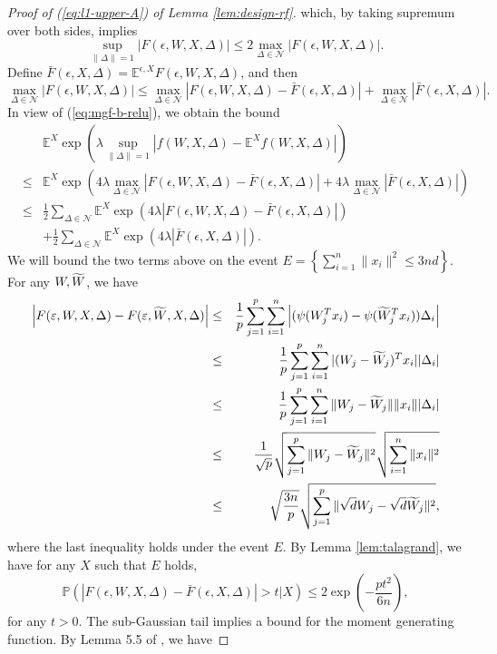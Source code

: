 \begin{proof}[Proof of (\ref{eq:l1-upper-A}) of Lemma \ref{lem:design-rf}]
which, by taking supremum over both sides, implies
$$\sup_{\|\Delta\|=1}|F(\epsilon,W,X,\Delta)|\leq 2\max_{\Delta\in\mathcal{N}}|F(\epsilon,W,X,\Delta)|.$$
Define $\bar{F}(\epsilon,X,\Delta)=\mathbb{E}^{\epsilon,X}F(\epsilon,W,X,\Delta)$, and then
$$\max_{\Delta\in\mathcal{N}}|F(\epsilon,W,X,\Delta)|\leq \max_{\Delta\in\mathcal{N}}|F(\epsilon,W,X,\Delta)-\bar{F}(\epsilon,X,\Delta)|+\max_{\Delta\in\mathcal{N}}|\bar{F}(\epsilon,X,\Delta)|.$$
In view of (\ref{eq:mgf-b-relu}), we obtain the bound
\begin{eqnarray}
\nonumber && \mathbb{E}^X\exp\left(\lambda \sup_{\|\Delta\|=1}\left|f(W,X,\Delta)-\mathbb{E}^Xf(W,X,\Delta)\right|\right) \\
\nonumber &\leq& \mathbb{E}^X\exp\left(4\lambda \max_{\Delta\in\mathcal{N}}|F(\epsilon,W,X,\Delta)-\bar{F}(\epsilon,X,\Delta)|+4\lambda \max_{\Delta\in\mathcal{N}}|\bar{F}(\epsilon,X,\Delta)|\right) \\
\label{eq:tala-mgf1-relu} &\leq& \frac{1}{2}\sum_{\Delta\in\mathcal{N}} \mathbb{E}^{X}\exp\left(4\lambda|F(\epsilon,W,X,\Delta)-\bar{F}(\epsilon,X,\Delta)|\right) \\
\label{eq:tala-mgf2-relu} && + \frac{1}{2}\sum_{\Delta\in\mathcal{N}} \mathbb{E}^{X}\exp\left(4\lambda |\bar{F}(\epsilon,X,\Delta)|\right).
\end{eqnarray}
We will bound the two terms above on the event $E=\left\{\sum_{i=1}^n\|x_i\|^2\leq 3nd\right\}$. For any $W,\widetilde{W}$, we have
\begin{eqnarray*}
\left|F(\epsilon,W,X,\Delta)-F(\epsilon,\wt{W},X,\Delta)\right| &\leq& \frac{1}{p}\sum_{j=1}^p\sum_{i=1}^n\left|({\psi}(W_j^Tx_i)-{\psi}(\wt{W}_j^Tx_i))\Delta_i\right| \\
&\leq& \frac{1}{p}\sum_{j=1}^p\sum_{i=1}^n|(W_j-\wt{W}_j)^Tx_i||\Delta_i| \\
&\leq& \frac{1}{p}\sum_{j=1}^p\sum_{i=1}^n\|W_j-\wt{W}_j\|\|x_i\||\Delta_i| \\
&\leq& \frac{1}{\sqrt{p}}\sqrt{\sum_{j=1}^p\|W_j-\wt{W}_j\|^2}\sqrt{\sum_{i=1}^n\|x_i\|^2} \\
&\leq& \sqrt{\frac{3n}{p}}\sqrt{\sum_{j=1}^p\|\sqrt{d}W_j-\sqrt{d}\wt{W}_j\|^2},
\end{eqnarray*}
where the last inequality holds under the event $E$. By Lemma \ref{lem:talagrand}, we have for any $X$ such that $E$ holds,
$$\mathbb{P}\left(|F(\epsilon,W,X,\Delta)-\bar{F}(\epsilon,X,\Delta)|>t\big|X\right)\leq 2\exp\left(-\frac{pt^2}{6n}\right),$$
for any $t>0$. The sub-Gaussian tail implies a bound for the moment generating function. By Lemma 5.5 of \cite{vershynin2010introduction}, we have

\end{proof}

